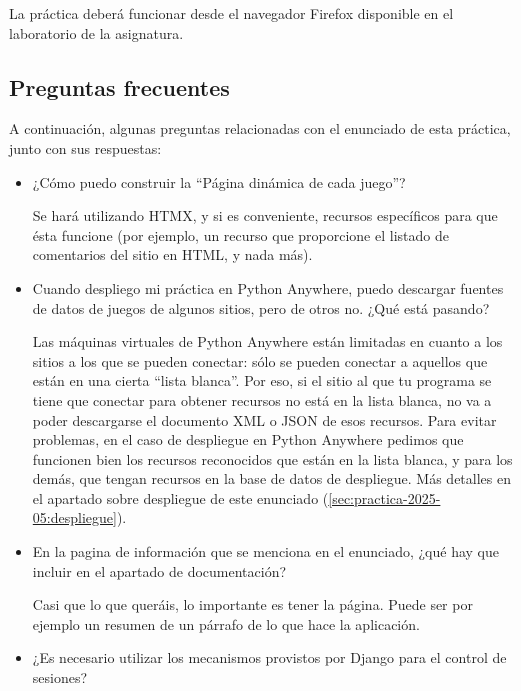La práctica deberá funcionar desde el navegador Firefox disponible en el laboratorio de la asignatura.

\subsection{Preguntas frecuentes}
\label{sec:practica-2025-05:preguntas}

A continuación, algunas preguntas relacionadas con el enunciado de esta práctica, junto con sus respuestas:

\begin{itemize}

\item ¿Cómo puedo construir la ``Página dinámica de cada juego''?

  Se hará utilizando HTMX, y si es conveniente, recursos específicos para que ésta funcione (por ejemplo, un recurso que proporcione el listado de comentarios del sitio en HTML, y nada más).
  
\item Cuando despliego mi práctica en Python Anywhere, puedo descargar fuentes de datos de juegos de algunos sitios, pero de otros no. ¿Qué está pasando?

  Las máquinas virtuales de Python Anywhere están limitadas en cuanto a los sitios a los que se pueden conectar: sólo se pueden conectar a aquellos que están en una cierta ``lista blanca''. Por eso, si el sitio al que tu programa se tiene que conectar para obtener recursos no está en la lista blanca, no va a poder descargarse el documento XML o JSON de esos recursos. Para evitar problemas, en el caso de despliegue en Python Anywhere pedimos que funcionen bien los recursos reconocidos que están en la lista blanca, y para los demás, que tengan recursos en la base de datos de despliegue. Más detalles en el apartado sobre despliegue de este enunciado (\ref{sec:practica-2025-05:despliegue}).
  
\item En la pagina de información que se menciona en el enunciado, ¿qué hay que incluir en el apartado de documentación?

Casi que lo que queráis, lo importante es tener la página. Puede ser por ejemplo un resumen de un párrafo de lo que hace la aplicación.
  
\item ¿Es necesario utilizar los mecanismos provistos por Django para el control de sesiones?


\end{itemize}
